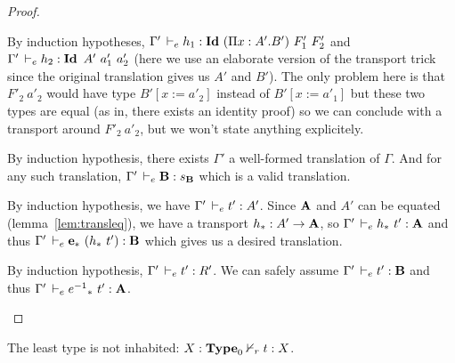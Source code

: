 \documentclass[a4paper,english]{lipics-utf8x}
\begin{document}
\begin{proof}
\begin{caselist}
      \begin{graycase}
        \begin{mathc}
        \end{mathc}
        By induction hypotheses,
        $\Gamma' \,\vdash_e h_1 : \operatorname{\mathbf{Id}~} (\Pi x:A'.B')\ F'_1\ F'_2$ and
        $\Gamma' \,\vdash_e h_2 : \operatorname{\mathbf{Id}~} A'\ a'_1\ a'_2$ (here we use an elaborate
        version of the transport trick since the original translation gives us
        $A'$ and $B'$).
        The only problem here is that $F'_2\ a'_2$ would have type
        $B'[x := a'_2]$ instead of $B'[x := a'_1]$ but these two types are equal
        (as in, there exists an identity proof) so we can conclude with a
        transport around $F'_2\ a'_2$, but we won't state anything explicitely.
      \end{graycase}

      \nextcase
      \begin{mathc}
        \ru{\derr \Gamma
          }{\Gamma \derr \mR : \sB}
      \end{mathc}
      By induction hypothesis, there exists $\Gamma'$ a well-formed translation
      of $\Gamma$. And for any such translation, $\Gamma' \,\vdash_e \operatorname{\mathbf{B}} : s_{\operatorname{\mathbf{B}}}$
      which is a valid translation.

      \nextcase
      \begin{mathc}
      \end{mathc}
      By induction hypothesis, we have $\Gamma' \,\vdash_e t' : A'$.
      Since $\operatorname{\mathbf{A}}$ and $A'$ can be equated (lemma~\ref{lem:transleq}),
      we have a transport $h_* : A' \to \operatorname{\mathbf{A}}$, so
      $\Gamma' \,\vdash_e h_*\ t' : \operatorname{\mathbf{A}}$ and thus
      $\Gamma' \,\vdash_e \operatorname{\mathbf{e}}_*\ (h_*\ t') : \operatorname{\mathbf{B}}$ which gives us a desired
      translation.

      \nextcase
      \begin{mathc}
      \end{mathc}
      By induction hypothesis, $\Gamma' \,\vdash_e t' : R'$.
      We can safely assume $\Gamma' \,\vdash_e t' : \operatorname{\mathbf{B}}$ and thus
      $\Gamma' \,\vdash_e {e^{-1}}_*\ t' : \operatorname{\mathbf{A}}$.
    \end{caselist}
  \end{proof}

  \begin{corollary}[Consistency]
    The least type is not inhabited: $X : \operatorname{\mathbf{Type}}_0 \nvdash_r t : X$.
  \end{corollary}
\end{document}
